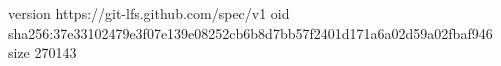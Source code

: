 version https://git-lfs.github.com/spec/v1
oid sha256:37e33102479e3f07e139e08252cb6b8d7bb57f2401d171a6a02d59a02fbaf946
size 270143
